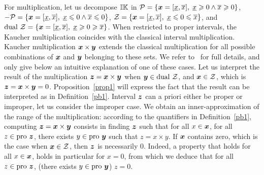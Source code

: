 \documentclass{sig-alternate-05-2015}
\newcommand{\pro}{\mbox{pro }}
\def\K{{\Bbb I \Bbb K}}
\begin{document}
For multiplication, let us decompose $\K$ in ${\cal P} = \{\x=[\underline x,\overline x], \; \underline x \geqslant 0 \wedge
\overline x \geqslant 0\}$, ${- \cal P} = \{\x=[\underline x,\overline x], \; \underline x \leqslant 0 \wedge
\overline x \leqslant 0\}$, 
${\cal Z} = \{\x=[\underline x,\overline x], \; \underline x \leqslant 0 \leqslant \overline x\}$, and 
${\mbox{dual } \cal Z} = \{\x=[\underline x,\overline x], \; \underline x \geqslant 0 \geqslant \overline x\}$. 
When restricted to proper intervals, the Kaucher multiplication coincides with the 
classical interval multiplication. 
Kaucher multiplication $\x \times \y$ extends the classical multiplication for all possible combinations of $\x$ and $\y$
belonging to these sets. We refer to~\cite{Kaucher} for full details, and only give below an intuitive explanation of one of these cases.
Let us  interpret the result of the multiplication $\z = \x \times \y$ when $\y \in \mbox{dual } \cal Z$, 
and $\x \in {\cal Z}$, which is $\z = \x \times \y = 0$. Proposition~\ref{prop1} will express the fact that 
the result can be interpreted as in Definition~\ref{pb1}. Interval $\z$ can a priori either be proper or improper, 
let us consider the improper case. We obtain an inner-approximation of the range of the multiplication: 
according to the quantifiers in Definition~\ref{pb1}, 
computing $\z = \x \times \y$ consists in finding $\z$ such that 
for all $x \in \x$, for all $z \in \pro \z$, there exists $y \in \pro \y$ such that $z=x \times y$. If $\x$ contains zero, 
which is the case when $\x \in {\cal Z}$, then $\z$ is necessarily $0$. 
Indeed, a property that holds for all $x \in \x$, holds in particular for $x=0$, from which we deduce that 
for all $z \in \pro \z$, (there exists $y \in \pro \y$) $z=0$.
\end{document}
